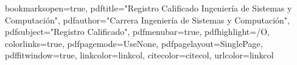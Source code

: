 \usepackage{amsmath,amssymb}             %
\usepackage[left=1.0in,right=1.0in,top=1.0in,bottom=1.0in,includefoot,includehead,headheight=14.04pt]{geometry}
\renewcommand{\baselinestretch}{1.05}

\usepackage[nottoc, notlof, notlot]{tocbibind}
\usepackage{minitoc}
\setcounter{minitocdepth}{2}
\mtcindent=15pt

\usepackage{aecompl}


\usepackage{ifpdf}


\usepackage{xcolor}                      %



\hypersetup
{
bookmarksopen=true,
pdftitle="Registro Calificado Ingeniería de Sistemas y Computación",
pdfauthor="Carrera Ingeniería de Sistemas y Computación", 
pdfsubject="Registro Calificado", %
pdfmenubar=true, %
pdfhighlight=/O, %
colorlinks=true, %
pdfpagemode=UseNone, %
pdfpagelayout=SinglePage, %
pdffitwindow=true, %
linkcolor=linkcol, %
citecolor=citecol, %
urlcolor=linkcol %
}


\setcounter{secnumdepth}{3}
\setcounter{tocdepth}{2}


\newcommand{\pd}[2]{\frac{\partial #1}{\partial #2}}
\def\abs{\operatorname{abs}}
\def\argmax{\operatornamewithlimits{arg\,max}}
\def\argmin{\operatornamewithlimits{arg\,min}}
\def\diag{\operatorname{Diag}}
\newcommand{\eqRef}[1]{(\ref{#1})}

\usepackage{rotating}                    %
\usepackage{fancyhdr}                    %

